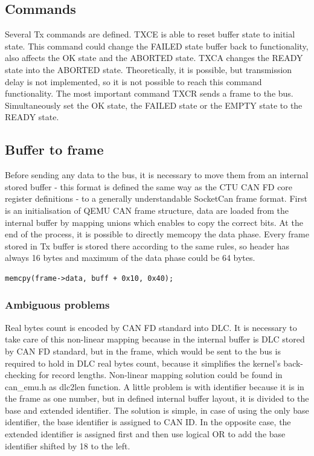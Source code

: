 \documentclass{ctuthesis}
\begin{document}
 \subsection{Commands}
  Several Tx commands are defined. TXCE is able to reset buffer state to initial state. This command could change the FAILED state buffer back to functionality, also affects the OK state and the ABORTED state. TXCA changes the READY state into the ABORTED state. Theoretically, it is possible, but transmission delay is not implemented, so it is not possible to reach this command functionality. The most important command TXCR sends a frame to the bus. Simultaneously set the OK state, the FAILED state or the EMPTY state to the READY state.
 
 \subsection{Buffer to frame}
  Before sending any data to the bus, it is necessary to move them from an internal stored buffer - this format is defined the same way as the CTU CAN FD core register definitions - to a generally understandable SocketCan frame format. First is an initialisation of QEMU CAN frame structure, data are loaded from the internal buffer by mapping unions which enables to copy the correct bits. At the end of the process, it is possible to directly memcopy the data phase. Every frame stored in Tx buffer is stored there according to the same rules, so header has always 16 bytes and maximum of the data phase could be 64 bytes.
  \begin{verbatim}memcpy(frame->data, buff + 0x10, 0x40);\end{verbatim}
 
  \subsubsection{Ambiguous problems}
   Real bytes count is encoded by CAN FD standard into DLC. It is necessary to take care of this non-linear mapping because in the internal buffer is DLC stored by CAN FD standard, but in the frame, which would be sent to the bus is required to hold in DLC real bytes count, because it simplifies the kernel's back-checking for record lengths. Non-linear mapping solution could be found in can\_emu.h as dlc2len function. A little problem is with identifier because it is in the frame as one number, but in defined internal buffer layout, it is divided to the base and extended identifier. The solution is simple, in case of using the only base identifier, the base identifier is assigned to CAN ID. In the opposite case, the extended identifier is assigned first and then use logical OR to add the base identifier shifted by 18 to the left. 
   
\end{document}
